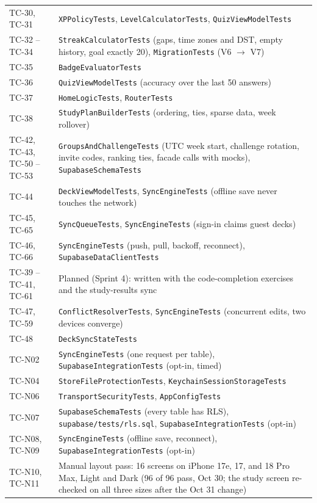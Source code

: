 \documentclass[12pt,letterpaper]{article}
\begin{document}
\begin{xltabular}{\textwidth}{@{}L{2.4cm} Y@{}}
TC-30, TC-31 & \texttt{XPPolicyTests}, \texttt{LevelCalculatorTests}, \texttt{QuizViewModelTests} \\
TC-32 -- TC-34 & \texttt{StreakCalculatorTests} (gaps, time zones and DST, empty history, goal exactly 20), \texttt{MigrationTests} (V6 $\to$ V7) \\
TC-35 & \texttt{BadgeEvaluatorTests} \\
TC-36 & \texttt{QuizViewModelTests} (accuracy over the last 50 answers) \\
TC-37 & \texttt{HomeLogicTests}, \texttt{RouterTests} \\
TC-38 & \texttt{StudyPlanBuilderTests} (ordering, ties, sparse data, week rollover) \\
TC-42, TC-43, TC-50 -- TC-53 & \texttt{GroupsAndChallengeTests} (UTC week start, challenge rotation, invite codes, ranking ties, facade calls with mocks), \texttt{SupabaseSchemaTests} \\
TC-44 & \texttt{DeckViewModelTests}, \texttt{SyncEngineTests} (offline save never touches the network) \\
TC-45, TC-65 & \texttt{SyncQueueTests}, \texttt{SyncEngineTests} (sign-in claims guest decks) \\
TC-46, TC-66 & \texttt{SyncEngineTests} (push, pull, backoff, reconnect), \texttt{SupabaseDataClientTests} \\
TC-39 -- TC-41, TC-61 & Planned (Sprint 4): written with the code-completion exercises and the study-results sync \\
TC-47, TC-59 & \texttt{ConflictResolverTests}, \texttt{SyncEngineTests} (concurrent edits, two devices converge) \\
TC-48 & \texttt{DeckSyncStateTests} \\
TC-N02 & \texttt{SyncEngineTests} (one request per table), \texttt{SupabaseIntegrationTests} (opt-in, timed) \\
TC-N04 & \texttt{StoreFileProtectionTests}, \texttt{KeychainSessionStorageTests} \\
TC-N06 & \texttt{TransportSecurityTests}, \texttt{AppConfigTests} \\
TC-N07 & \texttt{SupabaseSchemaTests} (every table has RLS), \texttt{supabase/tests/rls.sql}, \texttt{SupabaseIntegrationTests} (opt-in) \\
TC-N08, TC-N09 & \texttt{SyncEngineTests} (offline save, reconnect), \texttt{SupabaseIntegrationTests} (opt-in) \\
TC-N10, TC-N11 & Manual layout pass: 16 screens on iPhone 17e, 17, and 18 Pro Max, Light and Dark (96 of 96 pass, Oct 30; the study screen re-checked on all three sizes after the Oct 31 change) \\

\end{xltabular}
\end{document}
